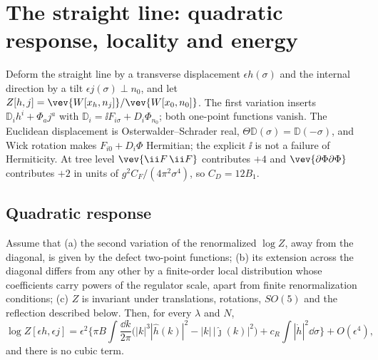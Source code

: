 \section{The straight line: quadratic response, locality and energy}
\label{sec:straight}

Deform the straight line by a transverse displacement $\epsilon h(\sigma)$ and the internal direction by
a tilt $\epsilon j(\sigma)\perp n_0$, and let $Z[h,j]=\vev{W[x_h,n_j]}/\vev{W[x_0,n_0]}$. The first
variation inserts $\mathbb D_ih^i+\Phi_aj^a$ with $\mathbb D_i=\ii F_{i\sigma}+D_i\Phi_{n_0}$; both
one-point functions vanish. The Euclidean displacement is Osterwalder--Schrader real,
$\Theta\mathbb D(\sigma)=\mathbb D(-\sigma)$, and Wick rotation makes $F_{i0}+D_i\Phi$ Hermitian; the
explicit $\ii$ is not a failure of Hermiticity. At tree level $\vev{\ii F\,\ii F}$ contributes $+4$ and
$\vev{\partial\Phi\partial\Phi}$ contributes $+2$ in units of $g^2C_F/(4\pi^2\sigma^4)$, so $C_D=12B_1$.

\subsection{Quadratic response}

\begin{proposition}
\label{prop:quadratic}
Assume that (a) the second variation of the renormalized $\log Z$, away from the diagonal, is given by the
defect two-point functions; (b) its extension across the diagonal differs from any other by a
finite-order local distribution whose coefficients carry powers of the regulator scale, apart from
finite renormalization conditions; (c) $Z$ is invariant under translations, rotations, $SO(5)$ and the
reflection described below. Then, for every $\lambda$ and $N$,
\begin{equation}
\log Z[\epsilon h,\epsilon j]=\epsilon^2\Big\{\pi B\!\int\!\frac{\dd k}{2\pi}\big(|k|^3|\hat h(k)|^2-|k|\,|\hat\jmath(k)|^2\big)
+c_R\!\int\!|\dot h|^2\dd\sigma\Big\}+O(\epsilon^4),
\label{eq:quadratic}
\end{equation}
and there is no cubic term.
\end{proposition}

